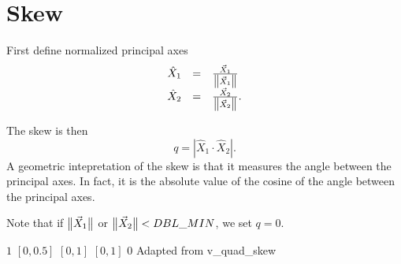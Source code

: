 \section{Skew}

First define normalized principal axes
\[
\begin{array}{lcl}
\hat X_1 &=& \frac {\vec X_1} {\big\lVert{\vec X_1}\big\rVert}\\
\hat X_2 &=& \frac {\vec X_2} {\big\lVert{\vec X_2}\big\rVert}.
\end{array}
\]

The skew is then
\[
q = | \hat X_1 \cdot \hat X_2 |.
\]
A geometric intepretation of the skew is that it measures the angle between the principal axes.
In fact, it is the absolute value of the cosine of the angle between the principal axes.

Note that if $\big\lVert{\vec X_1}\big\rVert$ or $\big\lVert{\vec X_2}\big\rVert < DBL\_MIN$, we set $q = 0$.

%
{$1$}%
{$[0,0.5]$}%
{$[0,1]$}%
{$[0,1]$}%
{$0$}%
{Adapted from \cite{rob:87}}%
{v\_quad\_skew}%

